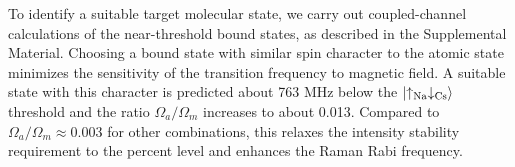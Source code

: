 \documentclass[aps,prl,twocolumn,10pt,superscriptaddress]{revtex4-1}
\newcommand{\Na}{\mathrm{Na}}
\newcommand{\Cs}{\mathrm{Cs}}
\begin{document}
To identify a suitable target molecular state, we carry out coupled-channel calculations of the near-threshold bound states, as described in the Supplemental Material.
Choosing a bound state with similar spin character to the atomic state  minimizes the sensitivity of the transition frequency to magnetic field.
A suitable state with this character is predicted about 763 MHz below the $\ket{\uparrow_{\Na} \downarrow_{\Cs}}$ threshold and the ratio $\Omega_a/\Omega_m$ increases to about 0.013.
Compared to $\Omega_a/\Omega_m \approx 0.003$
for other combinations, this relaxes the intensity stability requirement to the percent level and enhances the Raman Rabi frequency. %
\end{document}
